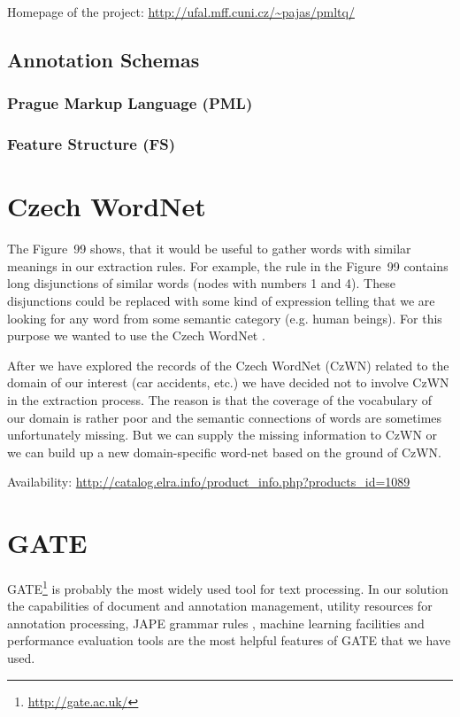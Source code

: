 Homepage of the project: \url{http://ufal.mff.cuni.cz/~pajas/pmltq/}

\subsection{Annotation Schemas}
\subsubsection{Prague Markup Language (PML)}
\subsubsection{Feature Structure (FS)}


\section{Czech WordNet}

The Figure~99 shows, that it would be useful to gather words with similar meanings in our extraction rules. For example, the rule in the Figure~99 contains long disjunctions of similar words (nodes with numbers 1 and 4). These disjunctions could be replaced with some kind of expression telling that we are looking for any word from some semantic category (e.g. human beings). For this purpose we wanted to use the Czech WordNet \citep{biblio:WordNetCZ2004}. 

After we have explored the records of the Czech WordNet (CzWN) related to the domain of our interest (car accidents, etc.) we have decided not to involve CzWN in the extraction process. The reason is that the coverage of the vocabulary of our domain is rather poor and the semantic connections of words are sometimes unfortunately missing. But we can supply the missing information to CzWN or we can build up a new domain-specific word-net based on the ground of CzWN.  

Availability: \url{http://catalog.elra.info/product_info.php?products_id=1089}



\section{GATE}
GATE\footnote{\url{http://gate.ac.uk/}} \citep{biblio:GATE_ACL2002} is probably the most widely used tool for text processing. In our solution the capabilities of document and annotation management, utility resources for annotation processing, JAPE grammar rules \citep{Cunningham00jape:a}, machine learning facilities and performance evaluation tools are the most helpful features of GATE that we have used.

